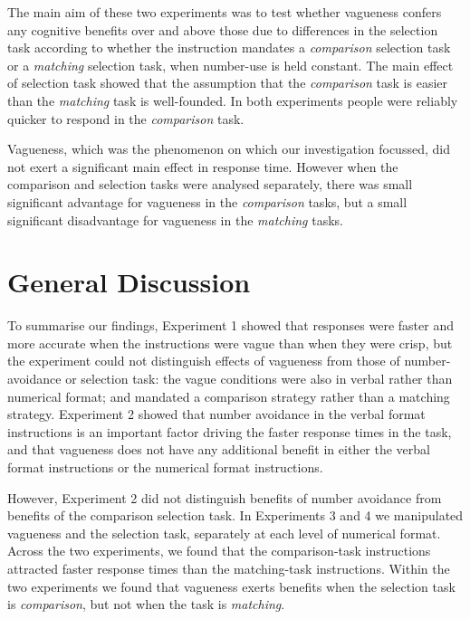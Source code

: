 \documentclass[%
man,		%
floatsintext,%
apacite%
]{apa6}
\begin{document}
The main aim of these two experiments was to test whether vagueness confers any cognitive benefits over and above those due to differences in the selection task according to whether the instruction mandates a \emph{comparison} selection task or a \emph{matching} selection task, when number-use is held constant. The main effect of selection task showed that the assumption that the \emph{comparison} task is easier than the \emph{matching} task is well-founded. In both experiments people were reliably quicker to respond in the \emph{comparison} task. 

Vagueness, which was the phenomenon on which our investigation focussed, did not exert a significant main effect in response time. However when the comparison and selection tasks were analysed separately, there was small significant advantage for vagueness in the \emph{comparison} tasks, but a small significant disadvantage for vagueness in the \emph{matching} tasks. 

\section{General Discussion}

To summarise our findings, Experiment 1 showed that responses were faster and more accurate when the instructions were vague than when they were crisp, but the experiment could not distinguish effects of vagueness from those of number-avoidance or selection task: the vague conditions were also in verbal rather than numerical format; and mandated a comparison strategy rather than a matching strategy.  Experiment 2 showed that number avoidance in the verbal format instructions is an important factor driving the faster response times in the task, and that vagueness does not have any additional benefit in either the verbal format instructions or the numerical format instructions. 

However, Experiment 2 did not distinguish benefits of number avoidance from benefits of the comparison selection task. In Experiments 3 and 4 we manipulated vagueness and the selection task, separately at each level of numerical format. Across the two experiments, we found that the comparison-task instructions attracted faster response times than the matching-task instructions. Within the two experiments we found that vagueness exerts benefits when the selection task is \emph{comparison}, but not when the task is \emph{matching}.
\end{document}
